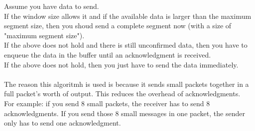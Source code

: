 Assume you have data to send. \\
If the window size allows it and if the available data is larger than the maximum segment size, then you shoud send a complete segment now (with a size of "maximum segment size"). \\
If the above does not hold and there is still unconfirmed data, then you have to enqueue the data in the buffer until an acknowledgment is received. \\
If the above does not hold, then you just have to send the data immediately. \\
\\
The reason this algoritmh is used is because it sends small packets together in a full packet's worth of output. This reduces the overhead of acknowledgments. \\
For example: if you send 8 small packets, the receiver has to send 8 acknowledgments. If you send those 8 small messages in one packet, the sender only has to send one acknowledgment.